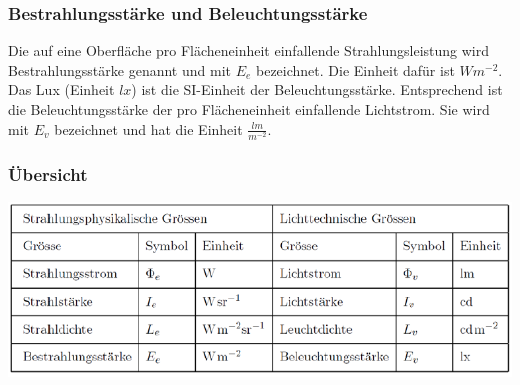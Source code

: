 \subsubsection{Bestrahlungsstärke und Beleuchtungsstärke}
Die auf eine Oberfläche pro Flächeneinheit einfallende Strahlungsleistung wird Bestrahlungsstärke
genannt und mit $E_e$ bezeichnet. Die Einheit dafür ist $Wm^{-2}$. \\
Das Lux (Einheit $lx$) ist die SI-Einheit der Beleuchtungsstärke. Entsprechend ist die Beleuchtungsstärke der pro Flächeneinheit einfallende Lichtstrom. Sie wird mit $E_v$ bezeichnet und hat die Einheit $\frac{lm}{m^{-2}}$.

\subsubsection{Übersicht}
\includegraphics[width=1\textwidth]{images/uebersicht_licht} 